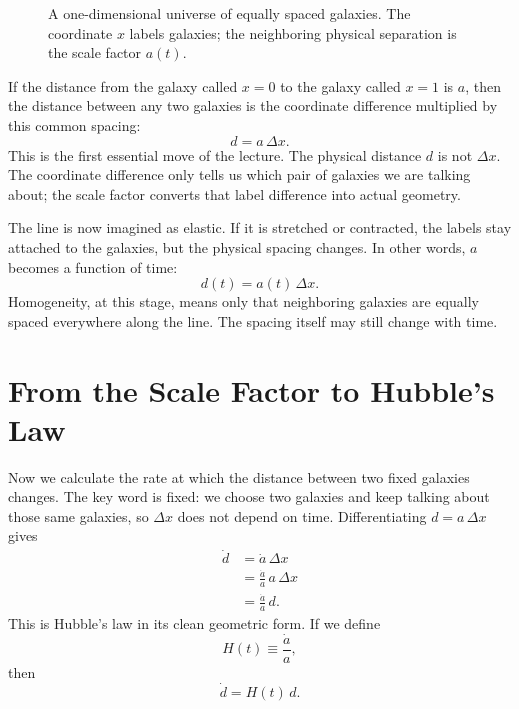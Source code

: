 \begin{figure}
\centering
{}
\caption{A one-dimensional universe of equally spaced galaxies. The coordinate \(x\) labels galaxies; the neighboring physical separation is the scale factor \(a(t)\).}
\end{figure}

If the distance from the galaxy called \(x=0\) to the galaxy called \(x=1\) is \(a\), then the distance between any two galaxies is the coordinate difference multiplied by this common spacing:
\begin{equation}
d=a\,\Delta x.
\end{equation}
This is the first essential move of the lecture. The physical distance \(d\) is not \(\Delta x\). The coordinate difference only tells us which pair of galaxies we are talking about; the scale factor converts that label difference into actual geometry.

The line is now imagined as elastic. If it is stretched or contracted, the labels stay attached to the galaxies, but the physical spacing changes. In other words, \(a\) becomes a function of time:
\begin{equation}
d(t)=a(t)\,\Delta x.
\end{equation}
Homogeneity, at this stage, means only that neighboring galaxies are equally spaced everywhere along the line. The spacing itself may still change with time.

\section{From the Scale Factor to Hubble's Law}

Now we calculate the rate at which the distance between two fixed galaxies changes. The key word is fixed: we choose two galaxies and keep talking about those same galaxies, so \(\Delta x\) does not depend on time. Differentiating \(d=a\,\Delta x\) gives
\begin{align}
\dot d &= \dot a\,\Delta x \\
       &= \frac{\dot a}{a}\,a\,\Delta x \\
       &= \frac{\dot a}{a}\,d.
\end{align}
This is Hubble's law in its clean geometric form. If we define
\begin{equation}
H(t)\equiv \frac{\dot a}{a},
\end{equation}
then
\begin{equation}
\dot d = H(t)\,d.
\end{equation}

